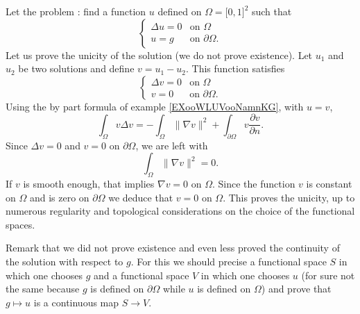 \begin{example}          \label{EXooLTODooOwJtGC}
    Let the problem : find a function \( u\) defined on \( \Omega=\mathopen[ 0 , 1 \mathclose]^2\) such that
    \begin{equation}
         \begin{cases}
             \Delta u=0    &   \text{on } \Omega\\
             u=g    &    \text{on } \partial\Omega.
         \end{cases}
     \end{equation}
     Let us prove the unicity of the solution (we do not prove existence). Let \( u_1\) and \( u_2\) be two solutions and define \( v=u_1-u_2\). This function satisfies
     \begin{equation}
          \begin{cases}
              \Delta v=0    &   \text{on } \Omega\\
              v=0    &    \text{on }\partial\Omega.  
          \end{cases}
      \end{equation}
      Using the by part formula of example \ref{EXooWLUVooNamnKG}, with \( u=v\),
      \begin{equation}
          \int_{\Omega}v\Delta v=-\int_{\Omega}\| \nabla v \|^2+\int_{\partial\Omega}v\frac{ \partial v }{ \partial n }.
      \end{equation}
      Since \( \Delta v=0\) and \( v=0\) on \( \partial\Omega\), we are left with
      \begin{equation}
          \int_{\Omega}\| \nabla v \|^2=0.
      \end{equation}
      If \( v\) is smooth enough, that implies \( \nabla v=0\) on \( \Omega\). Since the function \( v\) is constant on \( \Omega\) and is zero on \( \partial\Omega\) we deduce that \( v=0\) on \( \Omega\). This proves the unicity, up to numerous regularity and topological considerations on the choice of the functional spaces.

     Remark that we did not prove existence and even less proved the continuity of the solution with respect to \( g\). For this we should precise a functional space \( S\) in which one chooses \( g\) and a functional space \( V\) in which one chooses \( u\) (for sure not the same because \( g\) is defined on \( \partial \Omega\) while \( u\) is defined on \( \Omega\)) and prove that \( g\mapsto u\) is a continuous map \( S\to V\).
\end{example}

